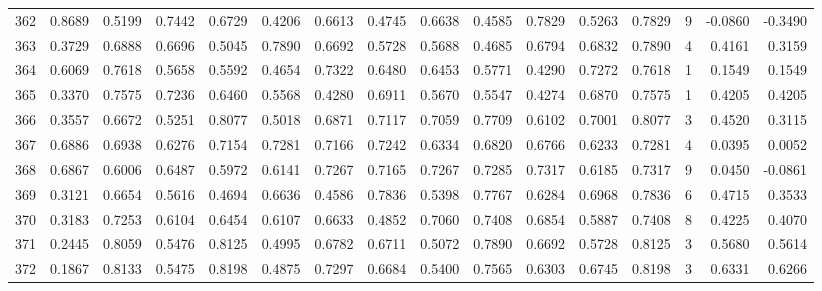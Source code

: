 \begin{tabular}{lrrrrrrrrrrrrrrr}
362 &      0.8689 &  0.5199 &  0.7442 &  0.6729 &  0.4206 &  0.6613 &  0.4745 &  0.6638 &  0.4585 &  0.7829 &   0.5263 &     0.7829 &      9 &                   -0.0860 &                    -0.3490 \\
363 &      0.3729 &  0.6888 &  0.6696 &  0.5045 &  0.7890 &  0.6692 &  0.5728 &  0.5688 &  0.4685 &  0.6794 &   0.6832 &     0.7890 &      4 &                    0.4161 &                     0.3159 \\
364 &      0.6069 &  0.7618 &  0.5658 &  0.5592 &  0.4654 &  0.7322 &  0.6480 &  0.6453 &  0.5771 &  0.4290 &   0.7272 &     0.7618 &      1 &                    0.1549 &                     0.1549 \\
365 &      0.3370 &  0.7575 &  0.7236 &  0.6460 &  0.5568 &  0.4280 &  0.6911 &  0.5670 &  0.5547 &  0.4274 &   0.6870 &     0.7575 &      1 &                    0.4205 &                     0.4205 \\
366 &      0.3557 &  0.6672 &  0.5251 &  0.8077 &  0.5018 &  0.6871 &  0.7117 &  0.7059 &  0.7709 &  0.6102 &   0.7001 &     0.8077 &      3 &                    0.4520 &                     0.3115 \\
367 &      0.6886 &  0.6938 &  0.6276 &  0.7154 &  0.7281 &  0.7166 &  0.7242 &  0.6334 &  0.6820 &  0.6766 &   0.6233 &     0.7281 &      4 &                    0.0395 &                     0.0052 \\
368 &      0.6867 &  0.6006 &  0.6487 &  0.5972 &  0.6141 &  0.7267 &  0.7165 &  0.7267 &  0.7285 &  0.7317 &   0.6185 &     0.7317 &      9 &                    0.0450 &                    -0.0861 \\
369 &      0.3121 &  0.6654 &  0.5616 &  0.4694 &  0.6636 &  0.4586 &  0.7836 &  0.5398 &  0.7767 &  0.6284 &   0.6968 &     0.7836 &      6 &                    0.4715 &                     0.3533 \\
370 &      0.3183 &  0.7253 &  0.6104 &  0.6454 &  0.6107 &  0.6633 &  0.4852 &  0.7060 &  0.7408 &  0.6854 &   0.5887 &     0.7408 &      8 &                    0.4225 &                     0.4070 \\
371 &      0.2445 &  0.8059 &  0.5476 &  0.8125 &  0.4995 &  0.6782 &  0.6711 &  0.5072 &  0.7890 &  0.6692 &   0.5728 &     0.8125 &      3 &                    0.5680 &                     0.5614 \\
372 &      0.1867 &  0.8133 &  0.5475 &  0.8198 &  0.4875 &  0.7297 &  0.6684 &  0.5400 &  0.7565 &  0.6303 &   0.6745 &     0.8198 &      3 &                    0.6331 &                     0.6266 \\

\end{tabular}

